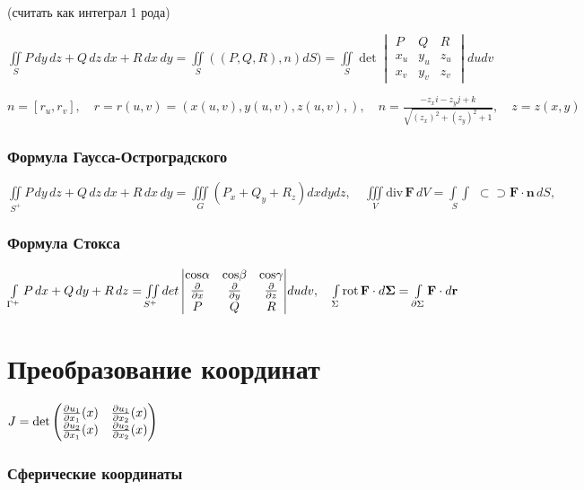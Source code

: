 \qquad  \qquad  \qquad \qquad \qquad \qquad \qquad \qquad \qquad (считать как интеграл 1 рода)

${\iint \limits _{S }{P\,dy\,dz+Q\,dz\,dx+R\,dx\,dy}} = {\iint \limits _{S }{((P,Q,R),n)}dS}) = \iint \limits _{S}{\det \begin{vmatrix}P&Q&R\\x_u&y_u&z_u\\x_v&y_v&z_v\end{vmatrix}}dudv$


$n = [r_u, r_v], \quad r = r(u,v) = (x(u,v), y(u,v), z(u,v),) , \quad n = \frac{-z_x i-z_y j+k}{\sqrt{(z_x)^2 + (z_y)^2 + 1}}, \quad z = z(x,y)$


\subsubsection{Формула Гаусса-Остроградского}
${\iint \limits _{S^{+}}{P\,dy\,dz+Q\,dz\,dx+R\,dx\,dy}} = {\iiint \limits _{G} \left(P_x + Q_y + R_z\right)dxdydz}, \quad \iiint\limits_V\mathrm{div}\,\mathbf{F}\,dV=\int\limits_{\,\,S}\!\!\!\!\int\!\!\!\!\!\!\!\!\!\!\!\!\,\!\!\,\subset\!\!\supset\mathbf F\cdot\mathbf{n}\,dS,$

\subsubsection{Формула Стокса}
${\int \limits _{\Gamma ^{+}}{P\,dx+Q\,dy+R\,dz}} = \iint \limits _{S^{+}}{det \begin{vmatrix}\rm{cos}\alpha &\rm{cos}\beta&\rm{cos}\gamma\\ \frac {\partial}{\partial x}&\frac {\partial}{\partial y}&\frac {\partial}{\partial z}\\P&Q&R\end{vmatrix}}dudv, \quad \int \limits _{\Sigma }{\mathrm  {rot}}\,{\mathbf  {F}}\cdot d{\mathbf  {\Sigma }}=\int \limits _{{\partial \Sigma }}{\mathbf  {F}}\cdot d{\mathbf  {r}}$

\section{Преобразование координат}

$J = \det {\begin{pmatrix}{\frac{\partial{u_{1}}}{\partial{x_{1}}}}(x)&{\frac{\partial{u_{1}}}{\partial{x_{2}}}}(x)\\{\frac{\partial{u_{2}}}{\partial{x_{1}}}}(x)&{\frac{\partial{u_{2}}}{\partial{x_{2}}}}(x)\end{pmatrix}}$

\subsubsection{Сферические координаты} 

